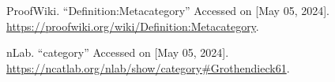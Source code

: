 \begin{thebibliography}{99}
	

ProofWiki. ``Definition:Metacategory'' Accessed on [May 05, 2024]. \url{https://proofwiki.org/wiki/Definition:Metacategory}.

nLab. ``category'' Accessed on [May 05, 2024]. \url{https://ncatlab.org/nlab/show/category#Grothendieck61}.
	
\end{thebibliography}